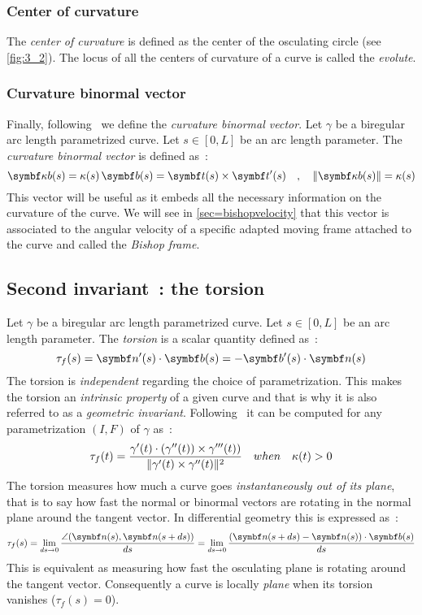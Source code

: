 \subsubsection{Center of curvature}
The \emph{center of curvature} is defined as the center of the osculating circle (see \cref{fig:3_2}). The locus of all the centers of curvature of a curve is called the \emph{evolute}.

\subsubsection{Curvature binormal vector}
\label{sec=kb}
Finally, following~\cite{Bergou2008} we define the \emph{curvature binormal vector}. Let $\gamma$ be a biregular arc length parametrized curve. Let $s\in [0,L]$ be an arc length parameter. The \emph{curvature binormal vector} is defined as~:
\begin{equation}
	\vect{\kappa b}(s) = \kappa(s)\,\vect{b}(s) = \vect{t}(s) \times \vect{t}'(s)
	\quad,\quad
	\norm{\vect{\kappa b}(s)}= \kappa(s)
\label{eq:kb}
\end{equation}
This vector will be useful as it embeds all the necessary information on the curvature of the curve. We will see in \cref{sec=bishopvelocity} that this vector is associated to the angular velocity of a specific adapted moving frame attached to the curve and called the \emph{Bishop frame}.

\subsection{Second invariant~: the torsion}\label{sec=torsion}
Let $\gamma$ be a biregular arc length parametrized curve. Let $s \in [0,L]$ be an arc length parameter. The \emph{torsion} is a scalar quantity defined as~:
\begin{equation}
	\tau_f(s) = \vect{n}'(s) \cdot \vect{b}(s) = - \vect{b}'(s) \cdot \vect{n}(s)
\end{equation}
The torsion is \emph{independent} regarding the choice of parametrization. This makes the torsion an \emph{intrinsic property} of a given curve and that is why it is also referred to as a \emph{geometric invariant}. Following~\cite[p.204]{Gray2006} it can be computed for any parametrization $(I,F)$ of $\gamma$ as~:
\begin{equation}
	\tau_f(t) = \frac{\gamma'(t) \cdot (\gamma''(t)) \times \gamma'''(t))}{\lVert\gamma'(t) \times \gamma''(t)\rVert^2}
	\quad when \quad
	\kappa(t) > 0
\end{equation}
The torsion measures how much a curve goes \emph{instantaneously out of its plane}, that is to say how fast the normal or binormal vectors are rotating in the normal plane around the tangent vector. In differential geometry this is expressed as~:
\begin{equation}
	\tau_f(s) 
	= \lim_{ds \to 0}\frac{\angle(\vect{n}(s),\vect{n}(s+ds))}{ds}
	= \lim_{ds \to 0}\frac{(\vect{n}(s+ds) - \vect{n}(s)) \cdot \vect{b}(s)}{ds}
\end{equation}
This is equivalent as measuring how fast the osculating plane is rotating around the tangent vector. Consequently a curve is locally \emph{plane} when its torsion vanishes ($\tau_f(s) = 0$).

